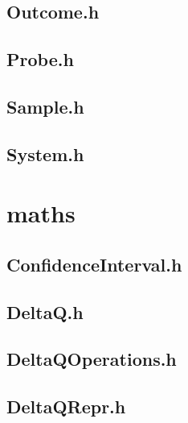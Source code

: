 \subsection{Outcome.h}


\subsection{Probe.h}


\subsection{Sample.h}


\subsection{System.h}


\section{maths}

\subsection{ConfidenceInterval.h}


\subsection{DeltaQ.h}


\subsection{DeltaQOperations.h}


\subsection{DeltaQRepr.h}


